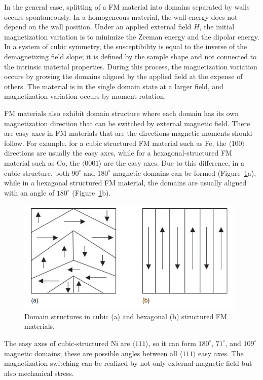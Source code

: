 In the general case, splitting of a FM material into domains separated by walls occurs spontaneously.
In a homogeneous material, the wall energy does not depend on the wall position.
 Under an applied external field $H$, the initial magnetization variation is to minimize the Zeeman energy and the dipolar energy. In a system of cubic symmetry, the susceptibility is equal to the inverse of the demagnetizing field slope; it is defined by the sample shape and not connected to the intrinsic material properties.
During this process, the magnetization variation occurs by growing the domains aligned by the applied field at the expense of others. The material is in the single domain state at a larger field, and magnetization variation occurs by moment rotation.


FM materials also exhibit domain structure where each domain has its own magnetization direction that can be switched by external magnetic field.
There are easy axes in FM materials that are the directions magnetic
moments should follow. For example, for a cubic structured FM material such as
Fe, the $\langle 100 \rangle$ directions are usually the easy axes, while for a hexagonal-structured FM material such as Co, the $\langle 0001\rangle$ are the easy axes. Due to this difference, in a cubic structure, both $90 ^\circ$ and $180^\circ$ magnetic domains can be formed (Figure~\ref{fig:domain_structure}a), while in a hexagonal structured FM material, the domains are usually aligned with an angle of $180 ^\circ $ (Figure~\ref{fig:domain_structure}b).

\begin{figure}[H]
\centering
\captionsetup{justification=centering,margin=2cm}
	\includegraphics[width=110mm]{fig/review/domain_structure.png}
	\caption[Domain structures in cubic and FM materials.]{Domain structures in cubic (a) and hexagonal (b) structured FM materials.}
\label{fig:domain_structure}
\end{figure}

The easy axes of cubic-structured Ni are $\langle 111 \rangle$, so it can form $180 ^\circ$, $71 ^\circ$, and $109 ^\circ$ magnetic domains; these are possible angles between all $\langle 111 \rangle$ easy axes. The magnetization switching can be realized by not only external magnetic field but also mechanical stress.

